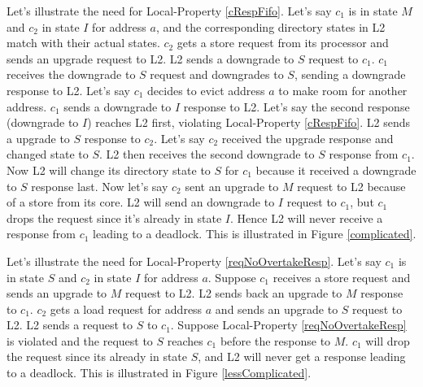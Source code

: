 Let's illustrate the need for Local-Property \ref{cRespFifo}. Let's say $c_1$ is
in state $M$ and $c_2$ in state $I$ for address $a$, and the corresponding
directory states in L2 match with their actual states. $c_2$ gets a store
request from its processor and sends an upgrade request to L2. L2 sends a
downgrade to $S$ request to $c_1$. $c_1$ receives the downgrade to $S$ request
and downgrades to $S$, sending a downgrade response to L2. Let's say $c_1$
decides to evict address $a$ to make room for another address. $c_1$ sends a
downgrade to $I$ response to L2. Let's say the second response (downgrade to
$I$) reaches L2 first, violating Local-Property \ref{cRespFifo}. L2 sends a
upgrade to $S$ response to $c_2$. Let's say $c_2$ received the upgrade response
and changed state to $S$.  L2 then receives the second downgrade to $S$ response
from $c_1$.  Now L2 will change its directory state to $S$ for $c_1$ because it
received a downgrade to $S$ response last. Now let's say $c_2$ sent an upgrade
to $M$ request to L2 because of a store from its core. L2 will send an downgrade
to $I$ request to $c_1$, but $c_1$ drops the request since it's already in state
$I$.  Hence L2 will never receive a response from $c_1$ leading to a deadlock.
This is illustrated in Figure \ref{complicated}.

Let's illustrate the need for Local-Property \ref{reqNoOvertakeResp}. Let's say
$c_1$ is in state $S$ and $c_2$ in state $I$ for address $a$. Suppose $c_1$
receives a store request and sends an upgrade to $M$ request to L2. L2 sends
back an upgrade to $M$ response to $c_1$. $c_2$ gets a load request for address
$a$ and sends an upgrade to $S$ request to L2. L2 sends a request to $S$ to
$c_1$. Suppose Local-Property \ref{reqNoOvertakeResp} is violated and the
request to $S$ reaches $c_1$ before the response to $M$. $c_1$ will drop the
request since its already in state $S$, and L2 will never get a response leading
to a deadlock. This is illustrated in Figure \ref{lessComplicated}.


